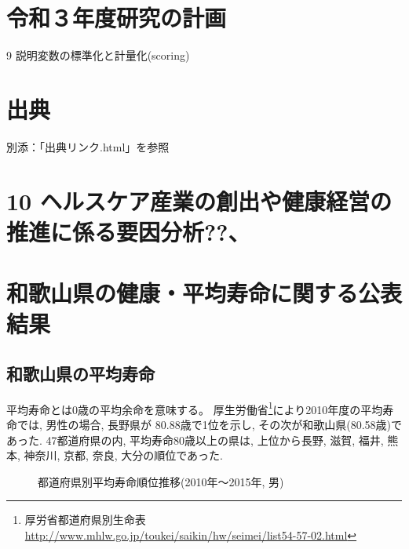 \chapter{令和３年度研究の計画}





9 説明変数の標準化と計量化(scoring)





\chapter{出典}

別添：「出典リンク.html」を参照







\chapter{10 ヘルスケア産業の創出や健康経営の推進に係る要因分析??、
}




\chapter{
和歌山県の健康・平均寿命に関する公表結果}




\section{和歌山県の平均寿命}
平均寿命とは0歳の平均余命を意味する。
厚生労働省\footnote{
	厚労省都道府県別生命表
	\url{http://www.mhlw.go.jp/toukei/saikin/hw/seimei/list54-57-02.html}}により2010年度の平均寿命では,
男性の場合, 長野県が 80.88歳で1位を示し, その次が和歌山県(80.58歳)であった. 47都道府県の内, 平均寿命80歳以上の県は,
上位から長野, 滋賀,  福井, 熊本,  神奈川,   京都,   奈良,   大分の順位であった.

\begin{figure}[h!]
	\begin{center}
		\caption{都道府県別平均寿命順位推移(2010年〜2015年, 男)}
	\end{center}
\end{figure}

